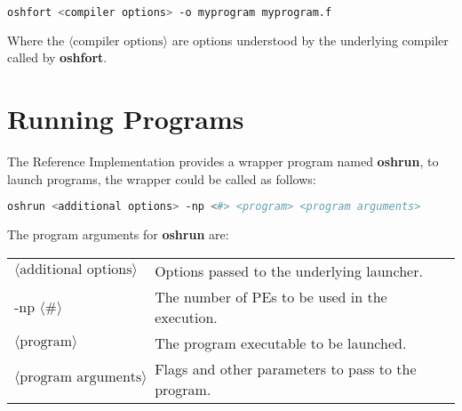 \begin{lstlisting}[language=bash]
oshfort <compiler options> -o myprogram myprogram.f
\end{lstlisting}
Where the $\langle\mbox{compiler options}\rangle$ are options understood by the underlying \Fortran{} compiler called by \textbf{oshfort}.

\section{Running Programs}

The  \openshmem{} Reference Implementation provides a wrapper program named \textbf{oshrun}, to launch \openshmem programs, the wrapper could
be called as follows:

\begin{lstlisting}[language=bash]
oshrun <additional options> -np <#> <program> <program arguments>
\end{lstlisting}
The program arguments for \textbf{oshrun} are:

\begin{tabular}{p{}p{}}
$\langle\mbox{additional options}\rangle$ & {Options passed to the underlying launcher.}\tabularnewline
-np $\langle\mbox{\#}\rangle$ & {The number of \ac{PE}s to be used in the execution.}\tabularnewline
$\langle\mbox{program}\rangle$ & {The program executable to be launched.}\tabularnewline
$\langle\mbox{program arguments}\rangle$ & {Flags and other parameters to pass to the program.}\tabularnewline
\end{tabular}

